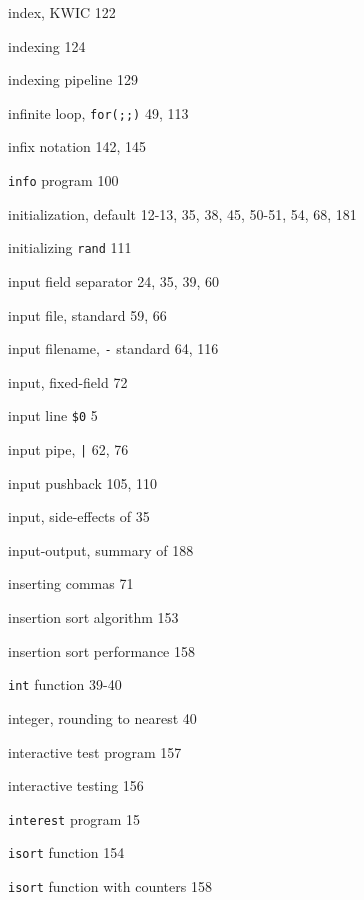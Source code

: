 \begin{multicols}{3}
\hangindent=3pc  index, KWIC 122

\hangindent=3pc  indexing 124

\hangindent=3pc  indexing pipeline 129

\hangindent=3pc  infinite loop, \verb'for(;;)' 49, 113

\hangindent=3pc  infix notation 142, 145

\hangindent=3pc  \verb'info' program 100

\hangindent=3pc  initialization, default 12-13, 35, 38, 45, 50-51, 54, 68, 181

\hangindent=3pc  initializing \verb'rand' 111

\hangindent=3pc  input field separator 24, 35, 39, 60

\hangindent=3pc  input file, standard 59, 66

\hangindent=3pc  input filename, \verb'-' standard 64, 116

\hangindent=3pc  input, fixed-field 72

\hangindent=3pc  input line \verb'$0' 5

\hangindent=3pc  input pipe, \verb'|' 62, 76

\hangindent=3pc  input pushback 105, 110

\hangindent=3pc  input, side-effects of 35

\hangindent=3pc  input-output, summary of 188

\hangindent=3pc  inserting commas 71

\hangindent=3pc  insertion sort algorithm 153

\hangindent=3pc  insertion sort performance 158

\hangindent=3pc  \verb'int' function 39-40

\hangindent=3pc  integer, rounding to nearest 40

\hangindent=3pc  interactive test program 157

\hangindent=3pc  interactive testing 156

\hangindent=3pc  \verb'interest' program 15 

\hangindent=3pc  \verb'isort' function 154

\hangindent=3pc  \verb'isort' function with counters 158


\end{multicols}
